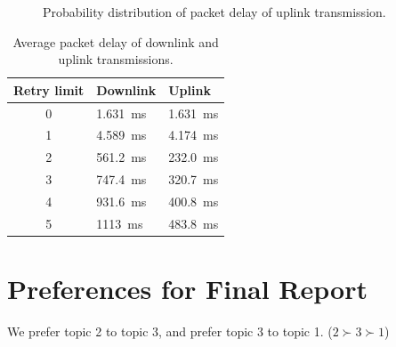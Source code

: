 \documentclass{article}
\begin{document}
\begin{figure}[htbp]
\centering
{}
\caption{Probability distribution of packet delay of uplink transmission.}
\label{figure: uplink delay cdf}
\end{figure}


\begin{table}[htbp]
\centering
    \caption{Average packet delay of downlink and uplink transmissions.}
    \vspace{2mm}
    \begin{tabular}{ | c | l | l | }
    \hline
    Retry limit & Downlink & Uplink \\ \hline
    0& \SI{1.631}{ms} & \SI{1.631}{ms} \\ \hline
    1 & \SI{4.589}{ms}  & \SI{4.174}{ms} \\  \hline
    2 & \SI{561.2}{ms} & \SI{232.0}{ms} \\  \hline
    3 & \SI{747.4}{ms}  & \SI{320.7}{ms} \\  \hline
    4 & \SI{931.6}{ms}  & \SI{400.8}{ms} \\  \hline
    5 &  \SI{1113}{ms} & \SI{483.8}{ms} \\ 
    \hline
\end{tabular}
\label{table: average delay}
\end{table}

\section{Preferences for Final Report}
We prefer topic 2 to topic 3, and prefer topic 3 to topic 1. ($2 \succ 3 \succ 1$)
\end{document}
